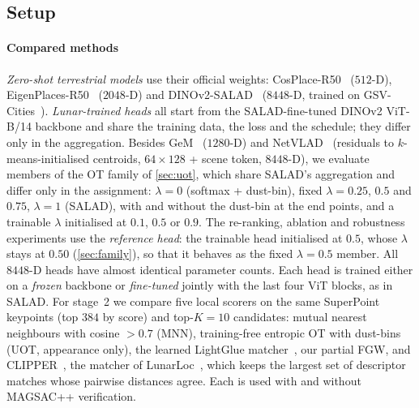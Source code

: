 \subsection{Setup}\label{sec:setup}
\paragraph*{Compared methods}
\emph{Zero-shot terrestrial models} use their official weights: CosPlace-R50~\cite{berton2022cosplace}
($512$-D), EigenPlaces-R50~\cite{berton2023eigenplaces} ($2048$-D) and DINOv2-SALAD~\cite{izquierdo2024optimal}
($8448$-D, trained on GSV-Cities~\cite{alibey2022gsv}). \emph{Lunar-trained heads} all start from the
SALAD-fine-tuned DINOv2 ViT-B/14 backbone and share the training data, the loss and the schedule; they
differ only in the aggregation. Besides GeM~\cite{radenovic2019gem} ($1280$-D) and
NetVLAD~\cite{arandjelovic2016netvlad} (residuals to $k$-means-initialised centroids, $64\times128$ +
scene token, $8448$-D), we evaluate members of the OT family of \cref{sec:uot}, which share SALAD's
aggregation and differ only in the assignment: $\lambda=0$ (softmax + dust-bin), fixed $\lambda=0.25$,
$0.5$ and $0.75$, $\lambda=1$ (SALAD), with and without the dust-bin at the end points, and a trainable
$\lambda$ initialised at $0.1$, $0.5$ or $0.9$. The re-ranking, ablation and robustness experiments use
the \emph{reference head}: the trainable head initialised at $0.5$, whose $\lambda$ stays at $0.50$
(\cref{sec:family}), so that it behaves as the fixed $\lambda=0.5$ member. All $8448$-D heads have almost identical parameter
counts. Each head is trained either on a \emph{frozen} backbone or \emph{fine-tuned} jointly with the
last four ViT blocks, as in SALAD. For stage~2 we compare five local scorers on the same
SuperPoint keypoints (top $384$ by score) and top-$K=10$ candidates: mutual nearest neighbours
with cosine $>0.7$ (MNN), training-free entropic OT with dust-bins (UOT, appearance only), the learned LightGlue
matcher~\cite{lindenberger2023lightglue}, our partial FGW, and CLIPPER~\cite{lusk2021clipper}, the
matcher of LunarLoc~\cite{thomas2026lunarloc}, which keeps the largest set of descriptor matches whose
pairwise distances agree. Each is used with and without MAGSAC++ verification.

